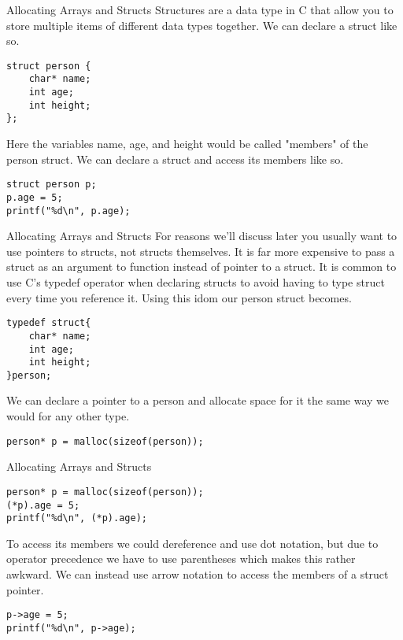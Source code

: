 \documentclass[10pt]{beamer}
\begin{document}
\begin{frame}[fragile]{Allocating Arrays and Structs}
Structures are a data type in C that allow you to store multiple items of different data types together. We can declare a struct like so.
\begin{verbatim}
struct person {
	char* name;
	int age;
	int height;
};
\end{verbatim}
Here the variables name, age, and height would be called "members" of the person struct. We can declare a struct and access its members like so.
\begin{verbatim}
struct person p;
p.age = 5;
printf("%d\n", p.age);
\end{verbatim}


\end{frame}

\begin{frame}[fragile]{Allocating Arrays and Structs}
For reasons we'll discuss later you usually want to use pointers to structs, not structs themselves. It is far more expensive to pass a struct as an argument to function instead of pointer to a struct. It is common to use C's typedef operator when declaring structs to avoid having to type struct every time you reference it. Using this idom our person struct becomes. 

\begin{verbatim}
typedef struct{
	char* name;
	int age;
	int height;
}person;
\end{verbatim}
We can declare a pointer to a person and allocate space for it the same way we would for any other type.
\begin{verbatim}
person* p = malloc(sizeof(person));
\end{verbatim}
\end{frame}

\begin{frame}[fragile]{Allocating Arrays and Structs}
\begin{verbatim}
person* p = malloc(sizeof(person));
(*p).age = 5;
printf("%d\n", (*p).age);
\end{verbatim}
To access its members we could dereference and use dot notation, but due to operator precedence we have to use parentheses which makes this rather awkward. We can instead use arrow notation to access the members of a struct pointer.
\begin{verbatim}
p->age = 5;
printf("%d\n", p->age);
\end{verbatim}
\end{frame}
\end{document}
